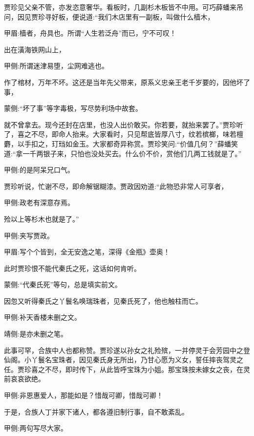 \begin{parag}
    贾珍见父亲不管，亦发恣意奢华。看板时，几副杉木板皆不中用。可巧薛蟠来吊问，因见贾珍寻好板，便说道:“我们木店里有一副板，叫做什么樯木，\begin{note}甲眉:樯者，舟具也。所谓“人生若泛舟”而已，宁不可叹！\end{note}出在潢海铁网山上，\begin{note}甲侧:所谓迷津易堕，尘网难逃也。\end{note}作了棺材，万年不坏。这还是当年先父带来，原系义忠亲王老千岁要的，因他坏了事，\begin{note}蒙侧:“坏了事”等字毒极，写尽势利场中故套。\end{note}就不曾拿去。现今还封在店里，也没人出价敢买。你若要，就抬来罢了。”贾珍听了，喜之不尽，即命人抬来。大家看时，只见帮底皆厚八寸，纹若槟榔，味若檀麝，以手扣之，玎珰如金玉。大家都奇异称赏。贾珍笑问:“价值几何？”薛蟠笑道:“拿一千两银子来，只怕也没处买去。什么价不价，赏他们几两工钱就是了。”\begin{note}甲侧:的是阿呆兄口气。\end{note}贾珍听说，忙谢不尽，即命解锯糊漆。贾政因劝道:“此物恐非常人可享者，\begin{note}甲侧:政老有深意存焉。\end{note}殓以上等杉木也就是了。”\begin{note}甲侧:夹写贾政。\end{note}\begin{note}甲眉:写个个皆到，全无安逸之笔，深得《金瓶》壶奥！\end{note}此时贾珍恨不能代秦氏之死，这话如何肯听。\begin{note}蒙侧:“代秦氏死”等句，总是填实前文。\end{note}
\end{parag}


\begin{parag}
    因忽又听得秦氏之丫鬟名唤瑞珠者，见秦氏死了，他也触柱而亡。\begin{note}甲侧:补天香楼未删之文。\end{note}\begin{note}靖侧:是亦未删之笔。\end{note}此事可罕，合族中人也都称赞。贾珍遂以孙女之礼殓殡，一并停灵于会芳园中之登仙阁。小丫鬟名宝珠者，因见秦氏身无所出，乃甘心愿为义女，誓任摔丧驾灵之任。贾珍喜之不尽，即时传下，从此皆呼宝珠为小姐。那宝珠按未嫁女之丧，在灵前哀哀欲绝。\begin{note}甲侧:非恩惠爱人，那能如是？惜哉可卿，惜哉可卿！\end{note}于是，合族人丁并家下诸人，都各遵旧制行事，自不敢紊乱。\begin{note}甲侧:两句写尽大家。\end{note}
\end{parag}


